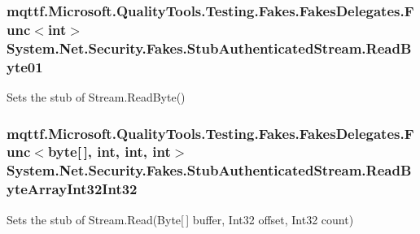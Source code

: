 \hypertarget{class_system_1_1_net_1_1_security_1_1_fakes_1_1_stub_authenticated_stream_a645abc34f5e8fa11dfd8efbc891e9daf}{
\subsubsection[{Read\-Byte01}]{\setlength{\rightskip}{0pt plus 5cm}mqttf.\-Microsoft.\-Quality\-Tools.\-Testing.\-Fakes.\-Fakes\-Delegates.\-Func$<$int$>$ System.\-Net.\-Security.\-Fakes.\-Stub\-Authenticated\-Stream.\-Read\-Byte01}}\label{class_system_1_1_net_1_1_security_1_1_fakes_1_1_stub_authenticated_stream_a645abc34f5e8fa11dfd8efbc891e9daf}


Sets the stub of Stream.\-Read\-Byte()

\hypertarget{class_system_1_1_net_1_1_security_1_1_fakes_1_1_stub_authenticated_stream_aa1cf02847870291177d19b4a1a46ab6a}{
\subsubsection[{Read\-Byte\-Array\-Int32\-Int32}]{\setlength{\rightskip}{0pt plus 5cm}mqttf.\-Microsoft.\-Quality\-Tools.\-Testing.\-Fakes.\-Fakes\-Delegates.\-Func$<$byte\mbox{[}$\,$\mbox{]}, int, int, int$>$ System.\-Net.\-Security.\-Fakes.\-Stub\-Authenticated\-Stream.\-Read\-Byte\-Array\-Int32\-Int32}}\label{class_system_1_1_net_1_1_security_1_1_fakes_1_1_stub_authenticated_stream_aa1cf02847870291177d19b4a1a46ab6a}


Sets the stub of Stream.\-Read(\-Byte\mbox{[}$\,$\mbox{]} buffer, Int32 offset, Int32 count)

